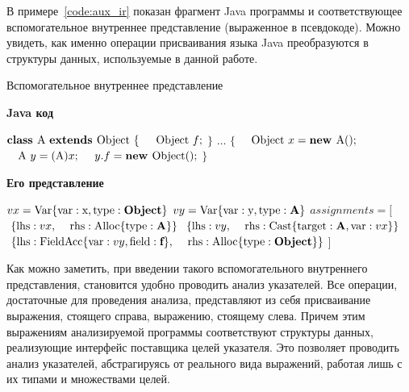 \documentclass[14pt,titlepage]{extarticle}
\newcommand{\algorithmictitle}[1]{\hspace{8mm}\textbf{#1}}
\newcommand{\eng}[1]{{\English#1}}
\newcommand{\java}{\eng{Java}\xspace}
\begin{document}
      В примере~\ref{code:aux_ir} показан фрагмент \java программы и
      соответствующее вспомогательное внутреннее представление (выраженное в
      псевдокоде).
      Можно увидеть, как именно операции присваивания языка \java преобразуются
      в структуры данных, используемые в данной работе.

      \begin{algorithm}
        \caption{Вспомогательное внутреннее представление}
        \label{code:aux_ir}
        \begin{multicols}{2}
          \algorithmictitle{\java код}
          \begin{algorithmic}
            \STATE $\textbf{class }\textmd{A }%
                    \textbf{extends }\textmd{Object }\{$
            \STATE $\textmd{\quad Object }f;$
            \STATE $\}$
            \STATE $\ldots$
            \STATE $\{$
            \STATE $\textmd{\quad Object }x = \textbf{new }\textmd{A}();$
            \STATE $\textmd{\quad A }y = (\textmd{A})x;$
            \STATE $\textmd{\quad}y.f = \textbf{new }\textmd{Object}();$
            \STATE $\}$
          \end{algorithmic}
          \columnbreak
          \algorithmictitle{Его представление}
          \begin{algorithmic}
            \STATE $vx = \textmd{Var}\{\textmd{var}: \textmd{x},%
                              \textmd{type}: \textbf{Object}\}$
            \STATE $vy = \textmd{Var}\{\textmd{var}: \textmd{y},%
                              \textmd{type}: \textbf{A}\}$
            \STATE $assignments = [$
            \STATE $\textmd{\ }\{ \textmd{lhs}: vx,$
            \STATE $\textmd{\ \, rhs}: \textmd{Alloc}\{\textmd{type}: \textbf{A}\}\}$
            \STATE $\textmd{\ }\{ \textmd{lhs}: vy,$
            \STATE $\textmd{\ \, rhs}: \textmd{Cast}\{\textmd{target}: \textbf{A}, \textmd{var}: vx\}\}$
            \STATE $\textmd{\ }\{ \textmd{lhs}: \textmd{FieldAcc}\{\textmd{var}: vy, \textmd{field}: \textbf{f}\},$
            \STATE $\textmd{\ \, rhs}: \textmd{Alloc}\{\textmd{type}: \textbf{Object}\}\}$
            \STATE $]$
          \end{algorithmic}
        \end{multicols}
      \end{algorithm}

      Как можно заметить, при введении такого вспомогательного внутреннего
      представления, становится удобно проводить анализ указателей.
      Все операции, достаточные для проведения анализа, представляют из себя
      присваивание выражения, стоящего справа, выражению, стоящему слева.
      Причем этим выражениям анализируемой программы соответствуют структуры
      данных, реализующие интерфейс поставщика целей указателя. Это позволяет
      проводить анализ указателей, абстрагируясь от реального вида выражений,
      работая лишь с их типами и множествами целей.
\end{document}

